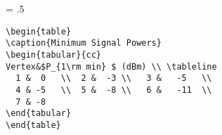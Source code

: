 \newpage
\baselineskip = .5\baselineskip  %
\begin{verbatim}
\begin{table}
\caption{Minimum Signal Powers}
\begin{tabular}{cc}
Vertex&$P_{1\rm min} $ (dBm) \\ \tableline
  1 &  0   \\  2 &  -3 \\   3 &   -5   \\
  4 & -5   \\  5 &  -8 \\   6 &   -11  \\
  7 & -8
\end{tabular}
\end{table}


\end{verbatim}



